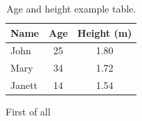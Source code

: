 \begin{table}[h]
	\begin{center}
		\begin{tabular}{l c c}
			\hline
			\textbf{Name} & \textbf{Age} & \textbf{Height} (m) \\
			\hline
			John & 25 & 1.80\\
			Mary & 34 & 1.72\\
			Janett & 14 & 1.54\\
			\hline
		\end{tabular}
		\caption{Age and height example table.}
		\label{tab:exampleTable}
	\end{center}
\end{table}

	First of all
